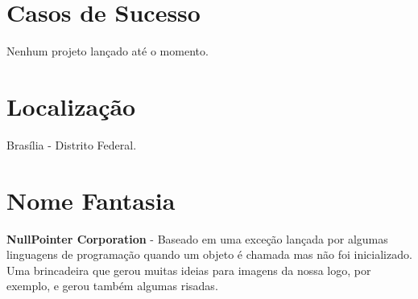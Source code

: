 \documentclass[11pt]{article}
\begin{document}
\section{Casos de Sucesso}
 Nenhum projeto lançado até o momento.
 
\section{Localização}
 Brasília - Distrito Federal.
 
\section{Nome Fantasia}
 \textbf{NullPointer Corporation} - Baseado em uma exceção lançada por algumas
 linguagens de programação quando um objeto é chamada mas não foi inicializado.
 Uma brincadeira que gerou muitas ideias para imagens da nossa logo, por exemplo,
 e gerou também algumas risadas.
\end{document}
